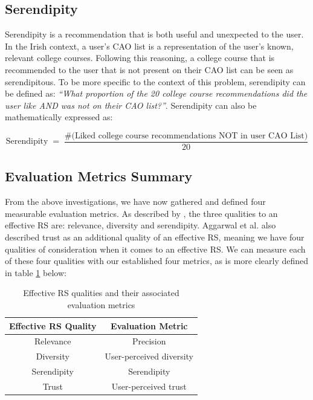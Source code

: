 \subsection{Serendipity}

Serendipity is a recommendation that is both useful and unexpected to the user.
In the Irish context, a user's CAO list is a representation of the user's known, relevant college courses.
Following this reasoning, a college course that is recommended to the user that is not present on their CAO list 
can be seen as serendipitous.
To be more specific to the context of this problem, serendipity can be defined as: \emph{``What proportion of the 20 college course recommendations did the user like AND was not on their CAO list?''}.
Serendipity can also be mathematically expressed as:

\[ 
\text{Serendipity}\;=\;\frac{\text{\# (Liked college course recommendations NOT in user CAO List)}}{20}
\]

\subsection{Evaluation Metrics Summary}

From the above investigations, we have now gathered and defined four measurable evaluation metrics.
As described by \cite{aggarwal2016recommender}, the three qualities to an effective RS are: relevance, diversity and
serendipity.
Aggarwal et al. also described trust as an additional quality of an effective RS,
meaning we have four qualities of consideration when it comes to an effective RS.
We can measure each of these four qualities with our established four metrics, 
as is more clearly defined in table \ref{tab:rs-quality-metrics} below:

\begin{table}[H]
\begin{center}
	\begin{tabular}{|c|c|}
	\hline
 	\textbf{Effective RS Quality} & \textbf{Evaluation Metric}\\
  	\hline
	Relevance & Precision\\
	\hline
	Diversity & User-perceived diversity\\
	\hline
	Serendipity & Serendipity\\
	\hline
	Trust & User-perceived trust\\
	\hline
	\end{tabular}
\end{center}
\caption{Effective RS qualities and their associated evaluation metrics}
\label{tab:rs-quality-metrics}
\end{table}

